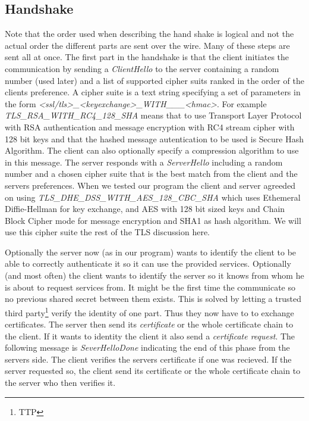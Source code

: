 \documentclass[10pt, a4paper]{article}
\begin{document}
\subsection{Handshake}
Note that the order used when describing the hand shake is logical and not the actual order the different parts are sent over the wire. Many of these steps are sent all at once. The first part in the handshake is that the client initiates the communication by sending a \emph{ClientHello} to the server containing a random number (used later) and a list of supported cipher suits ranked in the order of the clients preference. A cipher suite is a text string specifying a set of parameters in the form \emph{<ssl/tls>\_<keyexchange>\_WITH\_<encyption-type>\_<enc-key-size>\_<hmac>}. For example \emph{TLS\_RSA\_WITH\_RC4\_128\_SHA} means that to use Transport Layer Protocol with RSA authentication and message encryption with RC4 stream cipher with 128 bit keys and that the hashed message autentication to be used is Secure Hash Algorithm. The client can also optionally specify a compression algorithm to use in this message. The server responds with a \emph{ServerHello} including a random number and a chosen cipher suite that is the best match from the client and the servers preferences. When we tested our program the client and server agreeded on using \emph{TLS\_DHE\_DSS\_WITH\_AES\_128\_CBC\_SHA} which uses Ethemeral Diffie-Hellman for key exchange, and AES with 128 bit sized keys and Chain Block Cipher mode for message encryption and SHA1 as hash algorithm. We will use this cipher suite the rest of the TLS discussion here.

Optionally the server now (as in our program) wants to identify the client to be able to correctly authenticate it so it can use the provided services. Optionally (and most often) the client wants to  identify the server so it knows from whom he is about to request services from. It might be the first time the communicate so no previous shared secret between them exists. This is solved by letting a trusted third party\footnote{TTP} verify the identity of one part. Thus they now have to to exchange certificates. The server then send its \emph{certificate} or the whole certificate chain to the client. If it wants to identity the client it also send a \emph{certificate request}. The following message is \emph{SeverHelloDone} indicating the end of this phase from the servers side.  The client verifies the servers certificate if one was recieved. If the server requested so, the client send its certificate or the whole certificate chain to the server who then verifies it.
\end{document}

